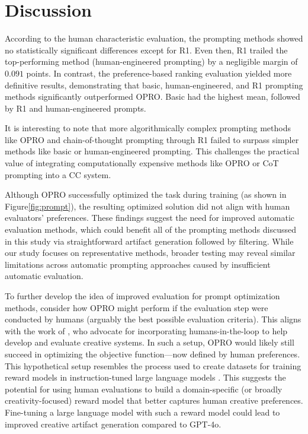 \documentclass[phd,electronic,oneside,twosidetoc,letterpaper,chaptercenter,parttop,lof]{byumsphd}
\begin{document}
\section{Discussion}

According to the human characteristic evaluation, the prompting methods showed no statistically significant differences except for R1. Even then, R1 trailed the top-performing method (human-engineered prompting) by a negligible margin of $0.091$ points. In contrast, the preference-based ranking evaluation yielded more definitive results, demonstrating that basic, human-engineered, and R1 prompting methods significantly outperformed OPRO. Basic had the highest mean, followed by R1 and human-engineered prompts. 

It is interesting to note that more algorithmically complex prompting methods like OPRO and chain-of-thought prompting through R1 failed to surpass simpler methods like basic or human-engineered prompting. This challenges the practical value of integrating computationally expensive methods like OPRO or CoT prompting into a CC system. 

Although OPRO successfully optimized the task during training (as shown in Figure\ref{fig:prompt}), the resulting optimized solution did not align with human evaluators' preferences. These findings suggest the need for improved automatic evaluation methods, which could benefit all of the prompting methods discussed in this study via straightforward artifact generation followed by filtering. While our study focuses on representative methods, broader testing may reveal similar limitations across automatic prompting approaches caused by insufficient automatic evaluation.

To further develop the idea of improved evaluation for prompt optimization methods, consider how OPRO might perform if the evaluation step were conducted by humans (arguably the best possible evaluation criteria). This aligns with the work of \citeauthor{spendlove2020humans}, who advocate for incorporating humans-in-the-loop to help develop and evaluate creative systems. In such a setup, OPRO would likely still succeed in optimizing the objective function—now defined by human preferences. This hypothetical setup resembles the process used to create datasets for training reward models in instruction-tuned large language models \cite{ouyang2022rlhf,chatGPT}. This suggests the potential for using human evaluations to build a domain-specific (or broadly creativity-focused) reward model that better captures human creative preferences. Fine-tuning a large language model with such a reward model could lead to improved creative artifact generation compared to GPT-4o.
\end{document}
